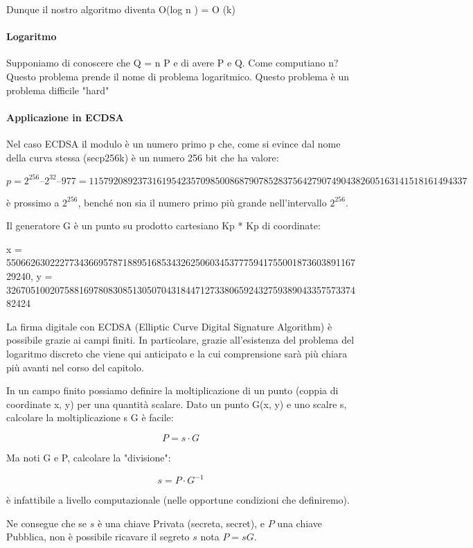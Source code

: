 \documentclass{book}
\theoremstyle{definition}
\begin{document}
Dunque il nostro algoritmo diventa O(log n ) = O (k)

\paragraph{Logaritmo}

Supponiamo di conoscere che Q = n P e di avere P e Q. Come computiano n?
Questo problema prende il nome di problema logaritmico.
Questo problema è un problema difficile "hard"

\paragraph{Applicazione in ECDSA}

Nel caso ECDSA il modulo è un numero primo p che, come si evince dal nome della curva stessa (secp256k) è un numero 256 bit che ha valore:

$$
p = 2^{256} – 2^{32} – 977 = 115792089237316195423570985008687907852837564279074904382605163141518161494337
$$

è prossimo a $2^{256}$, benché non sia il numero primo più grande nell'intervallo $2^{256}$.

Il generatore G è un punto su prodotto cartesiano Kp * Kp di coordinate:

x = 55066263022277343669578718895168534326250603453777594175500187360389116729240,
y = 32670510020758816978083085130507043184471273380659243275938904335757337482424


La firma digitale con ECDSA (Elliptic Curve Digital Signature Algorithm) è possibile grazie ai campi finiti.
In particolare, grazie all'esistenza del problema del logaritmo discreto che viene qui anticipato e la cui comprensione sarà più chiara più avanti nel corso del capitolo.

In un campo finito possiamo definire la moltiplicazione di un punto (coppia di coordinate x, y) per una quantità scalare.
Dato un punto G(x, y) e uno scalre s, calcolare la moltiplicazione s G è facile:

\[
    P = s \cdot G
\]

Ma noti G e P, calcolare la "divisione":

\[
    s = P \cdot G^{-1}
\]

è infattibile a livello computazionale (nelle opportune condizioni che definiremo).

Ne consegue che se $s$ è una chiave Privata (secreta, secret), e $P$ una chiave Pubblica, non è possibile ricavare il segreto $s$ nota $P = s G$.
\end{document}
